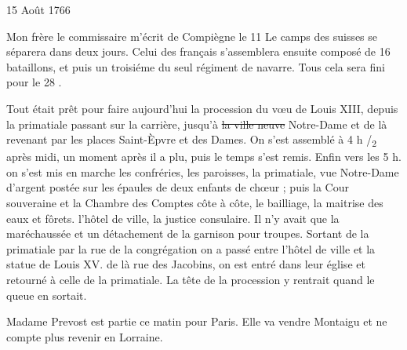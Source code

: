                      \begin{diary}{15 Août 1766}{}


                           Mon frère le commissaire m'écrit de Compiègne
                           le 11 \og Le camps des suisses se
                              séparera dans
                              deux jours. Celui des français s'assemblera
                              ensuite composé de 16 bataillons, et puis un troisiéme du seul
                                 régiment de navarre. Tous
                              cela sera fini pour le 28 \fg{}. \bigskip


                         Tout était prêt pour
                           faire aujourd'hui la
                           procession du vœu de Louis XIII, depuis la
                              primatiale
                           passant sur la
                              carrière, jusqu'à \sout{la ville neuve}
                           Notre-Dame et de là revenant par les places Saint-Èpvre et des
                              Dames. On s'est assemblé
                           à 4 h /\textsubscript{2}
                           après midi, un moment après il a
                           plu, puis le temps s'est remis. Enfin vers les
                           5 h. on s'est mis en marche les confréries,
                           les paroisses, la primatiale, vue Notre-Dame
                           d'argent postée sur les épaules de deux enfants
                           de chœur ; puis la Cour
                              souveraine et
                           la Chambre des Comptes
                           côte à côte, le bailliage,
                           la maitrise des eaux et fôrets. l'hôtel de
                           ville,
                           la justice consulaire. Il n'y avait que
                           la maréchaussée et un détachement de
                           la garnison pour troupes. Sortant de
                           la primatiale par
                              la rue de la congrégation
                           on a passé entre l'hôtel de ville et la statue
                           de Louis XV. de là rue des Jacobins, on est
                           entré dans leur église et retourné à
                           celle de la
                           primatiale. La tête de la
                           procession y rentrait quand le queue
                           en sortait. \bigskip



                           Madame Prevost est partie ce matin pour
                           Paris. Elle va vendre Montaigu et
                           ne compte plus revenir en Lorraine. \bigskip


                     \end{diary}



